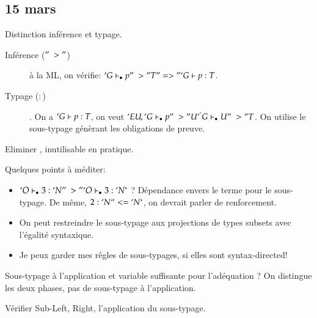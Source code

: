 \subsection*{15 mars}
Distinction inf\'erence et typage. 
\begin{description}
\item[Inf\'erence ($"~>"$)] \`a la ML, on v\'erifie: $`G \vdash_{\bullet} p "~>" T "=>"
  `G \vdash p : T$. 
\item[Typage ($:$)]. On a $`G \vdash p : T$, on veut $`E U, `G \vdash_{\bullet} p
  "~>" U `^ `G \vdash_{\bullet} U "~>" T$. On utilise le sous-typage g\'en\`erant les
  obligations de preuve.
\end{description}

Eliminer , inutilisable en pratique.

Quelques points \`a m\'editer:
\begin{itemize}
\item $`O \vdash_{\bullet} 3 : `N "~>" `O \vdash_{\bullet} 3 : `N^*$ ? D\'ependance envers le
  terme pour le sous-typage. De m\^eme, $2 : `N ``<= `N^*$, on devrait
  parler de renforcement.
\item On peut restreindre le sous-typage aux projections de types
  subsets avec l'\'egalit\'e syntaxique.
\item Je peux garder mes r\^egles de sous-typages, si elles sont syntax-directed!
\end{itemize}

Sous-typage \`a l'application et variable suffisante pour l'ad\'equation ?
On distingue les deux phases, pas de sous-typage \`a l'application.

V\'erifier Sub-{Left, Right}, l'application du sous-typage.

